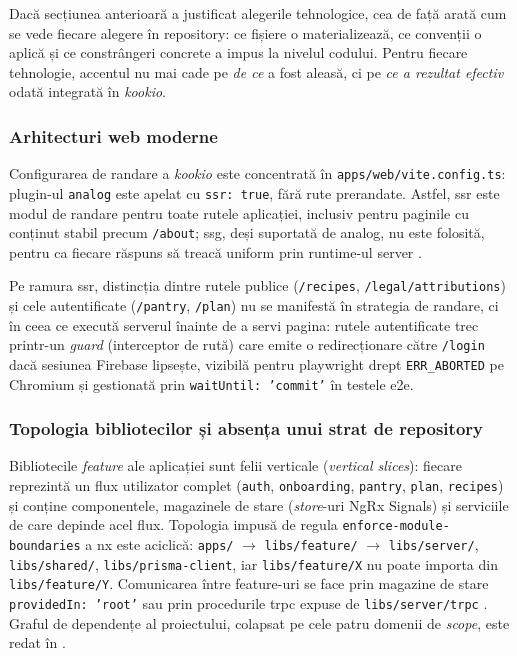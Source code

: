 Dacă secțiunea anterioară a justificat alegerile tehnologice, cea de față arată cum se vede fiecare alegere în repository: ce fișiere o materializează, ce convenții o aplică și ce constrângeri concrete a impus la nivelul codului. Pentru fiecare tehnologie, accentul nu mai cade pe \textit{de ce} a fost aleasă, ci pe \textit{ce a rezultat efectiv} odată integrată în \textit{\gls{kookio}}.

\subsubsection{Arhitecturi web moderne}\label{subsec:arhitecturi-implementare}

Configurarea de \gls{randare} a \textit{\gls{kookio}} este concentrată în \texttt{apps/web/vite.config.ts}: plugin-ul \texttt{analog} este apelat cu \texttt{ssr: true}, fără rute prerandate. Astfel, \acrshort{ssr} este modul de randare pentru toate rutele aplicației, inclusiv pentru paginile cu conținut stabil precum \texttt{/about}; \acrshort{ssg}, deși suportată de \gls{analog}, nu este folosită, pentru ca fiecare răspuns să treacă uniform prin runtime-ul server \cite{analog}.

Pe ramura \acrshort{ssr}, distincția dintre rutele publice (\texttt{/recipes}, \texttt{/legal/attributions}) și cele autentificate (\texttt{/pantry}, \texttt{/plan}) nu se manifestă în strategia de \gls{randare}, ci în ceea ce execută serverul înainte de a servi pagina: rutele autentificate trec printr-un \textit{guard} (interceptor de rută) care emite o redirecționare către \texttt{/login} dacă sesiunea Firebase lipsește, vizibilă pentru \gls{playwright} drept \texttt{ERR\_ABORTED} pe Chromium și gestionată prin \texttt{waitUntil: 'commit'} în testele \acrshort{e2e}.

\subsubsection{Topologia bibliotecilor și absența unui strat de repository}\label{subsec:topologie-biblioteci}

Bibliotecile \textit{feature} ale aplicației sunt felii verticale (\textit{vertical slices}): fiecare reprezintă un flux utilizator complet (\texttt{auth}, \texttt{onboarding}, \texttt{pantry}, \texttt{plan}, \texttt{recipes}) și conține componentele, magazinele de stare (\textit{store}-uri NgRx Signals) și serviciile de care depinde acel flux. Topologia impusă de regula \texttt{enforce-module-boundaries} a \gls{nx} este aciclică: \texttt{apps/} \(\rightarrow\) \texttt{libs/feature/} \(\rightarrow\) \texttt{libs/server/}, \texttt{libs/shared/}, \texttt{libs/prisma-client}, iar \texttt{libs/feature/X} nu poate importa din \texttt{libs/feature/Y}. Comunicarea între feature-uri se face prin magazine de stare \texttt{providedIn: 'root'} sau prin procedurile \gls{trpc} expuse de \texttt{libs/server/trpc} \cite{nx,nx_boundaries,trpc}. Graful de dependențe al proiectului, colapsat pe cele patru domenii de \textit{scope}, este redat în .

